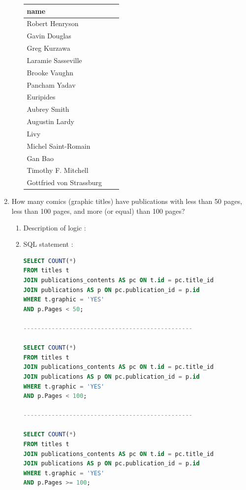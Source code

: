 \documentclass[doubleside, titlepage]{article}
\begin{document}
\begin{enumerate}
\begin{enumerate}
	\begin{tabular}{|l|c|r|}
  \hline
  name \\
  \hline	
Robert Henryson\\
Gavin Douglas\\
Greg Kurzawa\\
Laramie Sasseville\\
Brooke Vaughn\\
Pancham Yadav\\
Euripides\\
Aubrey Smith\\
Augustin Lardy\\
Livy\\
Michel Saint-Romain\\
Gan Bao\\
Timothy F. Mitchell\\
Gottfried von Strassburg\\
  \hline
\end{tabular}

	\end{enumerate}
	
\item How many comics (graphic titles) have publications with less than 50 pages, less than 100 pages, and more (or equal) than 100 pages?
	
	\begin{enumerate}
	\item Description of logic :\\
	\item SQL statement :
		\begin{lstlisting}[language=SQL,showspaces=false,basicstyle=\ttfamily,numberstyle=\tiny,commentstyle=\color{gray}]
SELECT COUNT(*)
FROM titles t
JOIN publications_contents AS pc ON t.id = pc.title_id
JOIN publications AS p ON pc.publication_id = p.id
WHERE t.graphic = 'YES'
AND p.Pages < 50;

------------------------------------------------

SELECT COUNT(*)
FROM titles t
JOIN publications_contents AS pc ON t.id = pc.title_id
JOIN publications AS p ON pc.publication_id = p.id
WHERE t.graphic = 'YES'
AND p.Pages < 100;

------------------------------------------------

SELECT COUNT(*)
FROM titles t
JOIN publications_contents AS pc ON t.id = pc.title_id
JOIN publications AS p ON pc.publication_id = p.id
WHERE t.graphic = 'YES'
AND p.Pages >= 100;
		\end{lstlisting}


\end{enumerate}
\end{enumerate}
\end{document}
